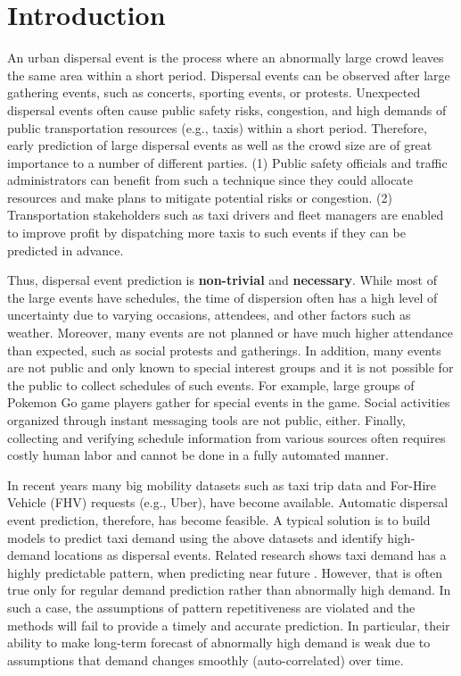 \documentclass[letterpaper]{article} %
\begin{document}
\section{Introduction}
An urban dispersal event is the process where an abnormally large crowd leaves the same area within a short period. Dispersal events can be observed after large gathering events, such as concerts, sporting events, or protests. Unexpected dispersal events often cause public safety risks, congestion, and high demands of public transportation resources (e.g., taxis) within a short period. Therefore, early prediction of large dispersal events as well as the crowd size are of great importance to a number of different parties. (1) Public safety officials and traffic administrators can benefit from such a technique since they could allocate resources and make plans to mitigate potential risks or congestion. (2) Transportation stakeholders such as taxi drivers and fleet managers are enabled to improve profit by dispatching more taxis to such events if they can be predicted in advance.    

Thus, dispersal event prediction is {\bf non-trivial} and {\bf necessary}. While most of the large events have schedules, the time of dispersion often has a high level of uncertainty due to varying occasions, attendees, and other factors such as weather. Moreover, many events are not planned or have much higher attendance than expected, such as social protests and gatherings. In addition, many events are not public and only known to special interest groups and it is not possible for the public to collect schedules of such events. For example, large groups of Pokemon Go game players gather for special events in the game. Social activities organized through instant messaging tools are not public, either. Finally, collecting and verifying schedule information from various sources often requires costly human labor and cannot be done in a fully automated manner.

In recent years many big mobility datasets such as taxi trip data and For-Hire Vehicle (FHV) requests (e.g., Uber), have become available. Automatic dispersal event prediction, therefore, has become feasible. A typical solution is to build models to predict taxi demand using the above datasets and identify high-demand locations as dispersal events. Related research shows taxi demand has a highly predictable pattern, when predicting near future \cite{zhao2016predicting,xu2017real,zhang2016framework,zhao2016predicting,moreira2013predicting,davis2016multi}. However, that is often true only for regular demand prediction rather than abnormally high demand. In such a case, the assumptions of pattern repetitiveness are violated and the methods will fail to provide a timely and accurate prediction. In particular, their ability to make long-term forecast of abnormally high demand is weak due to assumptions that demand changes smoothly (auto-correlated) over time. 
\end{document}
